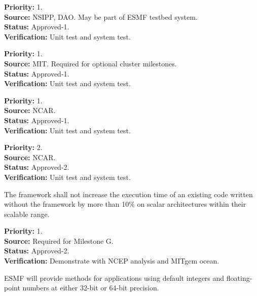\begin{reqlist}
{\bf Priority:} 1. \\
{\bf Source:} NSIPP, DAO.  May be part of ESMF testbed system. \\
{\bf Status:} Approved-1. \\
{\bf Verification:} Unit test and system test.
\end{reqlist}

\begin{reqlist}
{\bf Priority:} 1. \\
{\bf Source:} MIT.  Required for optional cluster milestones. \\
{\bf Status:} Approved-1. \\
{\bf Verification:} Unit test and system test.
\end{reqlist}

\begin{reqlist}
{\bf Priority:} 1. \\
{\bf Source:} NCAR. \\
{\bf Status:} Approved-1. \\
{\bf Verification:} Unit test and system test.
\end{reqlist}

\begin{reqlist}
{\bf Priority:} 2. \\
{\bf Source:} NCAR. \\
{\bf Status:} Approved-2. \\
{\bf Verification:} Unit test and system test.
\end{reqlist}

 \label{perf}
The framework shall not increase the execution time of an existing code 
written without the framework by more than 10\% on scalar 
architectures within their scalable range.
\begin{reqlist}
{\bf Priority:} 1. \\
{\bf Source:} Required for Milestone G. \\
{\bf Status:} Approved-2. \\
{\bf Verification:} Demonstrate with NCEP analysis and MITgcm ocean.
\end{reqlist}

 ESMF will provide methods for applications using
default integers and floating-point numbers at either 32-bit or 64-bit
precision.

